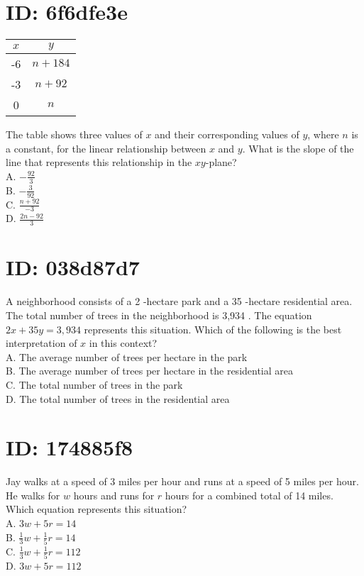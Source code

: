 \section*{ID: 6f6dfe3e}
\begin{center}
\begin{tabular}{|c|c|}
\hline
$x$ & $y$ \\
\hline
-6 & $n+184$ \\
\hline
-3 & $n+92$ \\
\hline
0 & $n$ \\
\hline
\end{tabular}
\end{center}

The table shows three values of $x$ and their corresponding values of $y$, where $n$ is a constant, for the linear relationship between $x$ and $y$. What is the slope of the line that represents this relationship in the $x y$-plane?\\
A. $-\frac{92}{3}$\\
B. $-\frac{3}{92}$\\
C. $\frac{n+92}{-3}$\\
D. $\frac{2 n-92}{3}$

\section*{ID: 038d87d7}
A neighborhood consists of a 2 -hectare park and a 35 -hectare residential area. The total number of trees in the neighborhood is 3,934 . The equation $2 x+35 y=3,934$ represents this situation. Which of the following is the best interpretation of $x$ in this context?\\
A. The average number of trees per hectare in the park\\
B. The average number of trees per hectare in the residential area\\
C. The total number of trees in the park\\
D. The total number of trees in the residential area

\section*{ID: 174885f8}
Jay walks at a speed of 3 miles per hour and runs at a speed of 5 miles per hour. He walks for $w$ hours and runs for $r$ hours for a combined total of 14 miles. Which equation represents this situation?\\
A. $3 w+5 r=14$\\
B. $\frac{1}{3} w+\frac{1}{5} r=14$\\
C. $\frac{1}{3} w+\frac{1}{5} r=112$\\
D. $3 w+5 r=112$


